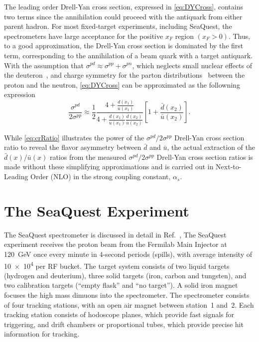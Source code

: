 \documentclass[reprint,aps,unsortedaddress,superscriptaddress,prl,floatfix,showpacs,linenumbers,final]{revtex4-2}
\begin{document}
The leading order Drell-Yan cross section, expressed in \cref{eq:DYCross},
contains two terms since the annihilation could proceed with the antiquark from either parent hadron.
For most fixed-target experiments, including SeaQuest,
the spectrometers have large acceptance for the positive $x_F$  region $\left(x_F > 0\right)$.
Thus, to a good approximation, the Drell-Yan cross section is dominated by the first term,
corresponding to the annihilation of a beam quark with a target antiquark.
With the assumption that $\sigma^{pd} \approx \sigma^{pp} + \sigma^{pn}$,
which neglects small nuclear effects of the deuteron~\cite{kumano1998,ehlers2014},
and charge symmetry for the parton distributions~\cite{londergan2010} between the proton and the neutron,
\cref{eq:DYCross} can be approximated as the followning expression
\begin{equation}
	\frac{\sigma^{pd}}{2\sigma^{pp}} \approx
	\frac{1}{2} \frac{4+\frac{d\left(x_1\right)}{u\left(x_1\right)}}{4+\frac{d\left(x_1\right)}{u\left(x_1\right)}\frac{\bar d\left(x_2\right)}{\bar u\left(x_2\right)}}
	\left[1+\frac{\bar d\left(x_2\right)}{\bar u\left(x_2\right)}\right].
	\label{eq:crRatio}
\end{equation}

While \cref{eq:crRatio} illustrates the power of the $\sigma^{pd}/2\sigma^{pp}$ Drell-Yan cross section
ratio to reveal the flavor asymmetry between $\bar d$ and $\bar u$,
the actual extraction of the $\bar d\left(x\right) / \bar u\left(x\right)$ ratios
from the measured $\sigma^{pd}/ 2 \sigma^{pp}$ Drell-Yan cross section ratios is
made without these simplifying approximations and is carried out in Next-to-Leading Order (NLO)
in the strong coupling constant, $\alpha_s$. %

\section{The SeaQuest Experiment}
\label{sec:seaquest_spectrometer}
The SeaQuest spectrometer is  discussed in detail in Ref.~\cite{aidala2019},
The SeaQuest experiment receives the  proton beam from the Fermilab Main Injector at \SI{120}{\GeV}
once every minute in 4-second periods (spills), with average intensity of \num{10e4} per RF bucket.
The target system consists of two liquid targets (hydrogen and deuterium),
three solid targets (iron, carbon and tungsten), and two calibration targets (``empty flask'' and ``no target'').
A solid iron magnet focuses the high mass dimuons into the spectrometer.
The spectrometer consists of four tracking stations, with an open air magnet between station~1 and~2.
Each tracking station consists of hodoscope planes, which provide fast signals for triggering,
and drift chambers or proportional tubes, which provide precise hit information for tracking.
\end{document}
